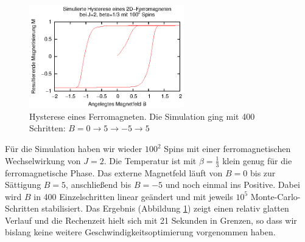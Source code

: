 \begin{figure}
  \includegraphics[width=0.6\textwidth]{bilder/hysterese/hysterese.eps}
  \caption{Hysterese eines Ferromagneten. Die Simulation ging mit 400 Schritten: $B=0\to 5 \to -5 \to 5$\label{hysterese}}
\end{figure}
Für die Simulation haben wir wieder $100^2$ Spins mit einer ferromagnetischen Wechselwirkung von $J=2$.
Die Temperatur ist mit $\beta=\frac 13$ klein genug für die ferromagnetische Phase.
Das externe Magnetfeld läuft von $B=0$ bis zur Sättigung $B=5$, anschließend bis $B=-5$ und noch einmal ins Positive.
Dabei wird $B$ in 400 Einzelschritten linear geändert und mit jeweils $10^5$ Monte-Carlo-Schritten stabilisiert.
Das Ergebnis (Abbildung \ref{hysterese}) zeigt einen relativ glatten Verlauf und die Rechenzeit hielt sich mit 21 Sekunden in Grenzen, so dass wir bislang keine weitere Geschwindigkeitsoptimierung vorgenommen haben.

